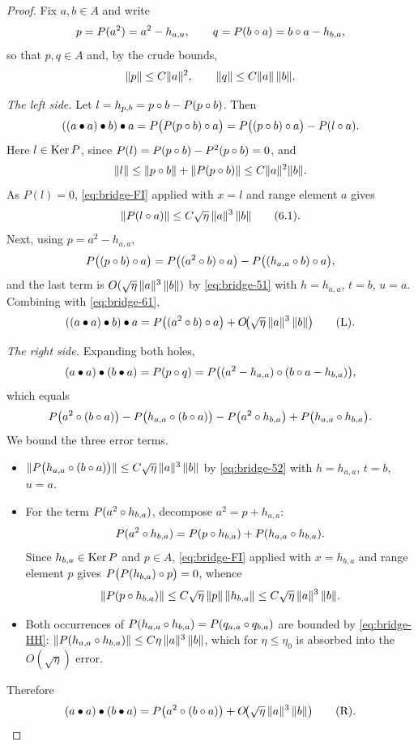 \begin{proof}
Fix $a,b\in A$ and write
\[
  p=P(a^2)=a^2-h_{a,a},\qquad q=P(b\circ a)=b\circ a-h_{b,a},
\]
so that $p,q\in A$ and, by the crude bounds,
\[
  \lVert p \rVert\le C\lVert a \rVert^2,\qquad \lVert q \rVert\le C\lVert a \rVert\,\lVert b \rVert.
\]

\emph{The left side.} Let $l=h_{p,b}=p\circ b-P(p\circ b)$. Then
\[
  ((a\bullet a)\bullet b)\bullet a
   =P\big(P(p\circ b)\circ a\big)
   =P\big((p\circ b)\circ a\big)-P(l\circ a).
\]
Here $l\in\operatorname{Ker} P$, since $P(l)=P(p\circ b)-P^2(p\circ b)=0$, and
\[
  \lVert l \rVert\le\lVert p\circ b \rVert+\lVert P(p\circ b) \rVert\le C\lVert a \rVert^2\lVert b \rVert.
\]
As $P(l)=0$, \eqref{eq:bridge-FI} applied with $x=l$ and range element $a$ gives
\begin{equation}\label{eq:bridge-61}
  \lVert P(l\circ a) \rVert\le C\sqrt\eta\,\lVert a \rVert^3\,\lVert b \rVert
  \qquad\text{\normalfont(6.1)}.
\end{equation}
Next, using $p=a^2-h_{a,a}$,
\[
  P\big((p\circ b)\circ a\big)
   =P\big((a^2\circ b)\circ a\big)-P\big((h_{a,a}\circ b)\circ a\big),
\]
and the last term is $O(\sqrt\eta\,\lVert a \rVert^3\,\lVert b \rVert)$ by \eqref{eq:bridge-51}
with $h=h_{a,a}$, $t=b$, $u=a$. Combining with \eqref{eq:bridge-61},
\begin{equation}\label{eq:bridge-L}
  ((a\bullet a)\bullet b)\bullet a
   =P\big((a^2\circ b)\circ a\big)+O\!\big(\sqrt\eta\,\lVert a \rVert^3\,\lVert b \rVert\big)
  \qquad\text{\normalfont(L)}.
\end{equation}

\emph{The right side.} Expanding both holes,
\[
  (a\bullet a)\bullet(b\bullet a)=P(p\circ q)
   =P\big((a^2-h_{a,a})\circ(b\circ a-h_{b,a})\big),
\]
which equals
\[
  P\big(a^2\circ(b\circ a)\big)
   -P\big(h_{a,a}\circ(b\circ a)\big)
   -P\big(a^2\circ h_{b,a}\big)
   +P\big(h_{a,a}\circ h_{b,a}\big).
\]
We bound the three error terms.
\begin{itemize}[leftmargin=*]
  \item $\lVert P\big(h_{a,a}\circ(b\circ a)\big) \rVert\le C\sqrt\eta\,\lVert a \rVert^3\,\lVert b \rVert$
    by \eqref{eq:bridge-52} with $h=h_{a,a}$, $t=b$, $u=a$.
  \item For the term $P(a^2\circ h_{b,a})$, decompose $a^2=p+h_{a,a}$:
    \[
      P(a^2\circ h_{b,a})=P(p\circ h_{b,a})+P(h_{a,a}\circ h_{b,a}).
    \]
    Since $h_{b,a}\in\operatorname{Ker} P$ and $p\in A$, \eqref{eq:bridge-FI} applied with
    $x=h_{b,a}$ and range element $p$ gives $P\big(P(h_{b,a})\circ p\big)=0$,
    whence
    \[
      \lVert P(p\circ h_{b,a}) \rVert\le C\sqrt\eta\,\lVert p \rVert\,\lVert h_{b,a} \rVert
       \le C\sqrt\eta\,\lVert a \rVert^3\,\lVert b \rVert.
    \]
  \item Both occurrences of $P(h_{a,a}\circ h_{b,a})=P(q_{a,a}\circ q_{b,a})$ are
    bounded by \eqref{eq:bridge-HH}:
    $\lVert P(h_{a,a}\circ h_{b,a}) \rVert\le C\eta\,\lVert a \rVert^3\,\lVert b \rVert$, which for
    $\eta\le\eta_0$ is absorbed into the $O(\sqrt\eta)$ error.
\end{itemize}
Therefore
\begin{equation}\label{eq:bridge-R}
  (a\bullet a)\bullet(b\bullet a)
   =P\big(a^2\circ(b\circ a)\big)+O\!\big(\sqrt\eta\,\lVert a \rVert^3\,\lVert b \rVert\big)
  \qquad\text{\normalfont(R)}.
\end{equation}


\end{proof}
